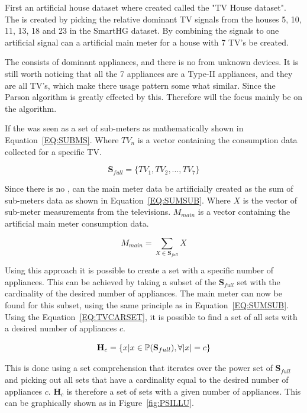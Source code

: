 First an artificial house dataset where created called the "TV House dataset". The  is created by picking the relative dominant TV signals from the houses 5, 10, 11, 13, 18 and 23 in the SmartHG dataset. By combining the signals to one artificial signal can a artificial main meter for a house with 7 TV's be created. 

The  consists of dominant appliances, and there is no  from unknown devices. It is still worth noticing that all the 7 appliances are a Type-II appliances, and they are all TV's, which make there usage pattern some what similar. Since the Parson algorithm is greatly effected by this. Therefore will the focus mainly be on the  algorithm. 

If the  was seen as a set of sub-meters as mathematically shown in Equation~\ref{EQ:SUBMS}. Where $TV_n$ is a vector containing the consumption data collected for a specific TV.

\begin{equation}
	\textbf{S}_{full} = \{ TV_1, TV_2, ... , TV_7 \}
	\label{EQ:SUBMS}
\end{equation}

Since there is no , can the main meter data be artificially created as the sum of sub-meters data as shown in Equation~\ref{EQ:SUMSUB}. Where $X$ is the vector of sub-meter measurements from the televisions. $M_{main}$ is a vector containing the artificial main meter consumption data. 

\begin{equation}
	M_{main} = \sum_{X \in \textbf{S}_{full}}X
	\label{EQ:SUMSUB}
\end{equation}

Using this approach it is possible to create a set with a specific number of appliances. This can be achieved by taking a subset of the $\textbf{S}_{full}$ set with the cardinality of the desired number of appliances. The main meter can now be found for this subset, using the same principle as in Equation~\ref{EQ:SUMSUB}. Using the Equation~\ref{EQ:TVCARSET}, it is possible to find a set of all sets with a desired number of appliances $c$.

\begin{equation}
	\textbf{H}_c = \{ x | x \in \mathbb{P}(\textbf{S}_{full}), \forall |x| = c   \}
	\label{EQ:TVCARSET}
\end{equation}

This is done using a set comprehension that iterates over the power set of $\textbf{S}_{full}$ and picking out all sets that have a cardinality equal to the desired number of appliances $c$. $\textbf{H}_c$ is therefore a set of sets with a given number of appliances. This can be graphically shown as in Figure~\ref{fig:PSILLU}. 

